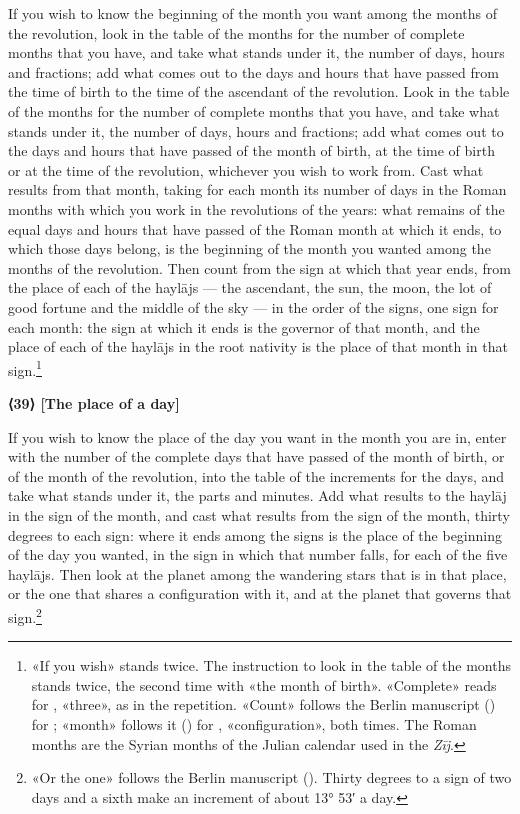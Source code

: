 \documentclass[11pt]{article}
\newcommand{\Fol}[1]{\marginpar{\footnotesize\color{gray}f.\,#1}}
\newcommand{\ChapterHead}[4]{\par\needspace{8\baselineskip}\bigskip\pdfbookmark[1]{#1}{ch-#2}\hypertarget{EN-K#2}{}%
 {\large\bfseries\interlinepenalty=10000 #1#4{\normalfont\normalsize#3}\par}\nobreak\medskip}
\begin{document}
\par If you wish to know the beginning of the month you want among the months of the revolution, look in the table of the months for the number of complete months that you have, and take what stands under it, the number of days, hours and fractions; add what comes out to the days and hours that have passed from the time of birth to the time of the ascendant of the revolution. Look in the table of the months for the number of complete months that you have, and take what stands under it, the number of days, hours and fractions; add what comes out to the days and hours that have passed of the month of birth, at the time of birth or at the time of the revolution, whichever you wish to work from. Cast what results from that month, taking for each month its number of days in the Roman months with which you work in the revolutions of the years: what remains of the equal days and hours that have passed of the Roman month at which it ends, to which those days belong, is the beginning of the month you wanted among the months of the revolution. Then count from the sign at which that year ends, from the place of each of the haylājs — the ascendant, the sun, the moon, the lot of good fortune and the middle of the sky — in the order of the signs, one sign for each month: the sign at which it ends is the governor of that month, and the place of each of the haylājs in the root nativity is the place of that month in that sign.\footnote{«If you wish» stands twice. The instruction to look in the table of the months stands twice, the second time with «the month of birth». «Complete» reads  for , «three», as in the repetition. «Count» follows the Berlin manuscript () for ; «month» follows it () for , «configuration», both times. The Roman months are the Syrian months of the Julian calendar used in the \emph{Zīj}.}\par
\ChapterHead{{\mdseries ⟨}39{\mdseries ⟩} [The place of a day]}{39}{}{}
\par \Fol{79v}If you wish to know the place of the day you want in the month you are in, enter with the number of the complete days that have passed of the month of birth, or of the month of the revolution, into the table of the increments for the days, and take what stands under it, the parts and minutes. Add what results to the haylāj in the sign of the month, and cast what results from the sign of the month, thirty degrees to each sign: where it ends among the signs is the place of the beginning of the day you wanted, in the sign in which that number falls, for each of the five haylājs. Then look at the planet among the wandering stars that is in that place, or the one that shares a configuration with it, and at the planet that governs that sign.\footnote{«Or the one» follows the Berlin manuscript (). Thirty degrees to a sign of two days and a sixth make an increment of about 13° 53′ a day.}\par
\end{document}
